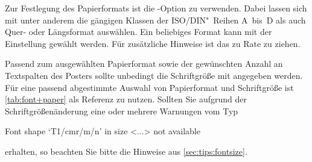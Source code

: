 \begin{DeclareEntity}{}
Zur Festlegung des Papierformats ist die \KOMAScript-Option 
 zu verwenden. Dabei lassen 
sich mit  unter anderem 
die gängigen Klassen der ISO/DIN"~Reihen A~bis~D als auch Quer- oder 
Längsformat auswählen. Ein beliebiges Format kann mit der Einstellung
 gewählt werden. Für 
zusätzliche Hinweise ist das \scrguide zu Rate zu ziehen.

Passend zum ausgewählten Papierformat sowie der gewünschten Anzahl an 
Textspalten des Posters sollte unbedingt die Schriftgröße mit 
 angegeben werden. Für eine 
passend abgestimmte Auswahl von Papierformat und Schriftgröße ist 
\autoref{tab:font+paper} als Referenz zu nutzen. Sollten Sie aufgrund der 
Schriftgrößenänderung eine oder mehrere Warnungen vom Typ
%
\begin{quoting}
\begin{Code}
Font shape `T1/cmr/m/n' in size <...> not available
\end{Code}
\end{quoting}
%
erhalten, so beachten Sie bitte die Hinweise aus \autoref{sec:tips:fontsize}.



\end{DeclareEntity}
